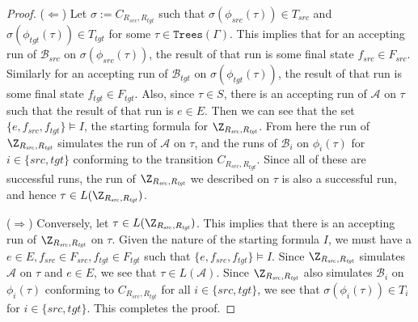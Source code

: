 \documentclass[12pt, a4paper]{article}
\newcommand{\Trees}[1]{\ensuremath{\texttt{Trees}\left(#1\right)}}
\newcommand{\substitution}{\ensuremath{\sigma}}
\newcommand{\automaton}{\ensuremath{\mathcal{A}}}
\newcommand{\automatonB}{\ensuremath{\mathcal{B}}}
\newcommand{\seedLang}{S}
\newcommand{\stLang}{T}
\newcommand{\src}{\mathit{src}}
\newcommand{\sourceLang}{\ensuremath{\stLang_{\src}}}
\newcommand{\sourceAutomatonB}{\ensuremath{\automatonB_{\src}}}
\newcommand{\sourceMap}{\ensuremath{\phi_{\src}}}
\newcommand{\tgt}{\mathit{tgt}}
\newcommand{\targetLang}{\ensuremath{\stLang_{\tgt}}}
\newcommand{\targetAutomatonB}{\ensuremath{\automatonB_{\tgt}}}
\newcommand{\targetMap}{\ensuremath{\phi_{\tgt}}}
\begin{document}
\begin{proof}
    ($\Leftarrow$) Let $\substitution := C_{R_\src, R_\tgt}$ such that $\substitution(\sourceMap(\tau)) \in \sourceLang$ and $\substitution(\targetMap(\tau)) \in \targetLang$ for some $\tau \in \Trees{\Gamma}$. This implies that for an accepting run of $\sourceAutomatonB$ on $\substitution(\sourceMap(\tau))$, the result of that run is some final state $f_\src \in F_\src$. Similarly for an accepting run of $\targetAutomatonB$ on $\substitution(\targetMap(\tau))$, the result of that run is some final state $f_\tgt \in F_\tgt$. Also, since $\tau \in \seedLang$, there is an accepting run of $\automaton$ on $\tau$ such that the result of that run is $e \in E$. Then we can see that the set $\{e, f_\src, f_\tgt\} \models I$, the starting formula for $\Z_{R_\src, R_\tgt}$. From here the run of $\Z_{R_\src, R_\tgt}$ simulates the run of $\automaton$ on $\tau$, and the runs of $\automatonB_i$ on $\phi_i(\tau)$ for $i \in \{\src, \tgt\}$ conforming to the transition $C_{R_\src, R_\tgt}$. Since all of these are successful runs, the run of $\Z_{R_\src, R_\tgt}$ we described on $\tau$ is also a successful run, and hence $\tau \in L(\Z_{R_\src, R_\tgt})$.

    ($\Rightarrow$) Conversely, let $\tau \in L(\Z_{R_\src, R_\tgt})$. This implies that there is an accepting run of $\Z_{R_\src, R_\tgt}$ on $\tau$. Given the nature of the starting formula $I$, we must have a $e \in E, f_\src \in F_\src, f_\tgt \in F_\tgt$ such that $\{e, f_\src, f_\tgt\} \models I$. Since $\Z_{R_\src, R_\tgt}$ simulates $\automaton$ on $\tau$ and $e \in E$, we see that $\tau \in L(\automaton)$. Since $\Z_{R_\src, R_\tgt}$ also simulates $\automatonB_i$ on $\phi_i(\tau)$ conforming to $C_{R_\src, R_\tgt}$ for all $i \in \{\src, tgt\}$, we see that $\substitution(\phi_i(\tau)) \in \stLang_i$ for $i \in \{\src, \tgt\}$. This completes the proof.


\end{proof}
\end{document}
